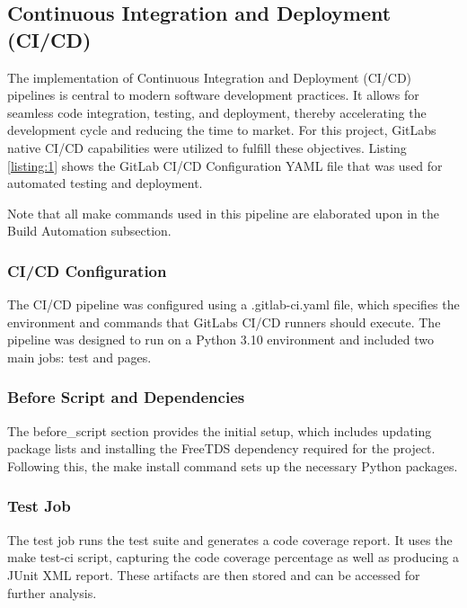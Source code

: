 \subsection{Continuous Integration and Deployment
(CI/CD)}\label{continuous-integration-and-deployment-cicd}

The implementation of Continuous Integration and Deployment (CI/CD)
pipelines is central to modern software development practices. It allows
for seamless code integration, testing, and deployment, thereby
accelerating the development cycle and reducing the time to market. For
this project, GitLab\textquotesingle s native CI/CD capabilities were
utilized to fulfill these objectives. Listing \ref{listing:1} shows the GitLab CI/CD
Configuration YAML file that was used for automated testing and
deployment.

Note that all make commands used in this pipeline are elaborated upon in
the Build Automation subsection.

\subsubsection{CI/CD Configuration}\label{cicd-configuration}

The CI/CD pipeline was configured using a .gitlab-ci.yaml file, which
specifies the environment and commands that GitLab\textquotesingle s
CI/CD runners should execute. The pipeline was designed to run on a
Python 3.10 environment and included two main jobs: test and pages.

\subsubsection{Before Script and
Dependencies}\label{before-script-and-dependencies}

The before\_script section provides the initial setup, which includes
updating package lists and installing the FreeTDS dependency required
for the project. Following this, the make install command sets up the
necessary Python packages.

\subsubsection{Test Job}\label{test-job}

The test job runs the test suite and generates a code coverage report.
It uses the make test-ci script, capturing the code coverage percentage
as well as producing a JUnit XML report. These artifacts are then stored
and can be accessed for further analysis.


